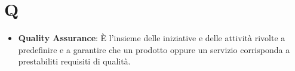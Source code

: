 \section*{Q}
\begin{itemize}
	\item
	\textbf{Quality Assurance}: È l’insieme delle iniziative e delle attività rivolte a predefinire e a garantire che un prodotto oppure un servizio corrisponda a prestabiliti requisiti di qualità.
\end{itemize}
\newpage